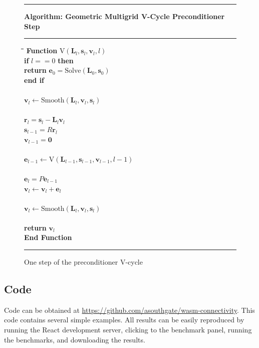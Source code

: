 \documentclass[11pt, a4paper]{article}
\begin{document}
\begin{figure}[h]
\centering
\hrule
\vspace{0.5em}
\noindent\textbf{Algorithm: Geometric Multigrid V-Cycle Preconditioner Step}
\vspace{0.5em}
\hrule
\vspace{0.5em}
\begin{tabbing}
\quad \= \quad \= \quad \= \quad \= \kill
\textbf{Function} $\text{V}(\mathbf{L}_l, \mathbf{s}_l, \mathbf{v}_l, l)$ \\
\> \> \textbf{if} $l == 0$ \textbf{then}\\
\> \> \> \> \textbf{return} $\mathbf{e}_0 = \text{Solve}(\mathbf{L}_0, \mathbf{s}_0)$ \\
\> \> \textbf{end if} \\
\\
\> \> $\mathbf{v}_l \leftarrow \text{Smooth}(\mathbf{L}_l, \mathbf{v}_l, \mathbf{s}_l)$ \\
\\
\> \> $\mathbf{r}_l = \mathbf{s}_l - \mathbf{L}_l \mathbf{v}_l$ \\
\> \> $\mathbf{s}_{l-1} = R \mathbf{r}_l$ \\
\> \> $\mathbf{v}_{l-1} = \mathbf{0}$ \\
\\
\> \> $\mathbf{e}_{l-1} \leftarrow \text{V}(\mathbf{L}_{l-1}, \mathbf{s}_{l-1}, \mathbf{v}_{l-1}, l-1)$ \\
\\
\> \> $\mathbf{e}_l = P \mathbf{e}_{l-1}$ \\
\> \> $\mathbf{v}_l \leftarrow \mathbf{v}_l + \mathbf{e}_l$ \\
\\
\> \> $\mathbf{v}_l \leftarrow \text{Smooth}(\mathbf{L}_l, \mathbf{v}_l, \mathbf{s}_l)$ \\
\\
\> \> \textbf{return} $\mathbf{v}_l$ \\
\textbf{End Function}
\end{tabbing}
\hrule
\caption{One step of the preconditioner V-cycle}
\label{alg:gmg_vcycle}
\end{figure}


\subsection{Code}

Code can be obtained at \url{https://github.com/asouthgate/wasm-connectivity}. This code contains several simple examples. All results can be easily reproduced by running the React development server, clicking to the benchmark panel, running the benchmarks, and downloading the results.
\end{document}

